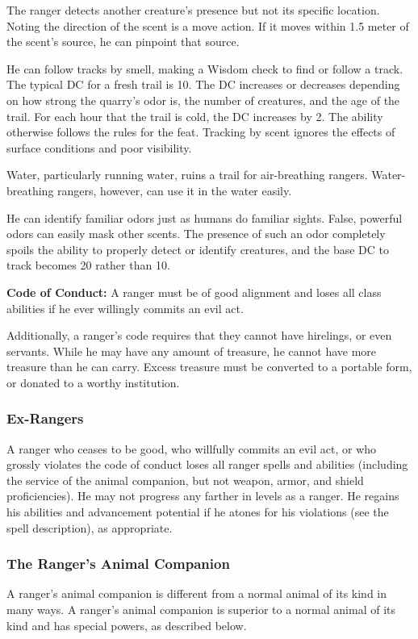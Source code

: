 The ranger detects another creature's presence but not its specific location. Noting the direction of the scent is a move action. If it moves within 1.5 meter of the scent's source, he can pinpoint that source.

He can follow tracks by smell, making a Wisdom check to find or follow a track. The typical DC for a fresh trail is 10. The DC increases or decreases depending on how strong the quarry's odor is, the number of creatures, and the age of the trail. For each hour that the trail is cold, the DC increases by 2. The ability otherwise follows the rules for the  feat. Tracking by scent ignores the effects of surface conditions and poor visibility.

Water, particularly running water, ruins a trail for air-breathing rangers. Water-breathing rangers, however, can use it in the water easily.

He can identify familiar odors just as humans do familiar sights. False, powerful odors can easily mask other scents. The presence of such an odor completely spoils the ability to properly detect or identify creatures, and the base  DC to track becomes 20 rather than 10.


\textbf{Code of Conduct:} A ranger must be of good alignment and loses all class abilities if he ever willingly commits an evil act.

Additionally, a ranger's code requires that they cannot have hirelings, or even servants. While he may have any amount of treasure, he cannot have more treasure than he can carry. Excess treasure must be converted to a portable form, or donated to a worthy institution.

\subsubsection{Ex-Rangers}
A ranger who ceases to be good, who willfully commits an evil act, or who grossly violates the code of conduct loses all ranger spells and abilities (including the service of the animal companion, but not weapon, armor, and shield proficiencies). He may not progress any farther in levels as a ranger. He regains his abilities and advancement potential if he atones for his violations (see the  spell description), as appropriate.

\subsubsection{The Ranger's Animal Companion}
A ranger's animal companion is different from a normal animal of its kind in many ways. A ranger's animal companion is superior to a normal animal of its kind and has special powers, as described below.

